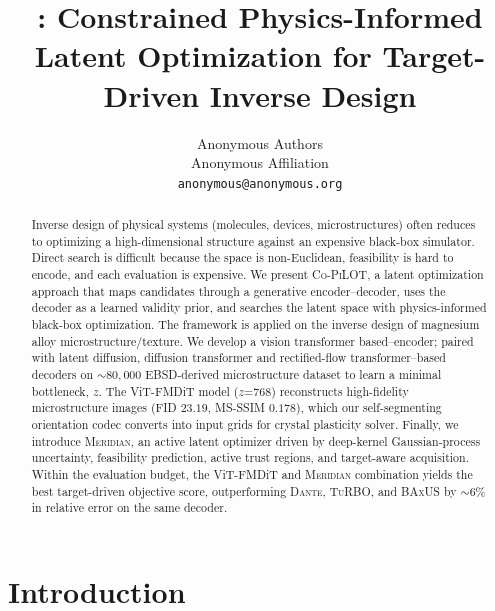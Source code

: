 \documentclass{article}
\title{\Co{}: Constrained Physics-Informed Latent Optimization for Target-Driven Inverse Design}
\author{%
  Anonymous Authors \\
  Anonymous Affiliation \\
  \texttt{anonymous@anonymous.org}
}
\newcommand{\Co}{\textsc{Co-PiLOT}}
\newcommand{\meridian}{\textsc{Meridian}}
\newcommand{\dante}{\textsc{Dante}}
\newcommand{\turbo}{\textsc{TuRBO}}
\newcommand{\baxus}{\textsc{BAxUS}}
\begin{document}
\maketitle

\begin{abstract}
Inverse design of physical systems (molecules, devices, microstructures) often reduces to optimizing a high-dimensional structure against an expensive black-box simulator. Direct search is difficult because the space is non-Euclidean, feasibility is hard to encode, and each evaluation is expensive. We present \Co{}, a latent optimization approach that maps candidates through a generative encoder--decoder, uses the decoder as a learned validity prior, and searches the latent space with physics-informed black-box optimization. The framework is applied on the inverse design of magnesium alloy microstructure/texture. We develop a vision transformer based--encoder; paired with latent diffusion, diffusion transformer and rectified-flow transformer--based decoders on $\sim80{,}000$ EBSD-derived microstructure dataset to learn a minimal bottleneck, $z$. The ViT-FMDiT model ($z$=$768$) reconstructs high-fidelity microstructure images (FID $23.19$, MS-SSIM $0.178$), which our self-segmenting orientation codec converts into input grids for crystal plasticity solver. Finally, we introduce \meridian{}, an active latent optimizer driven by deep-kernel Gaussian-process uncertainty, feasibility prediction, active trust regions, and target-aware acquisition. Within the evaluation budget, the ViT-FMDiT and \meridian{} combination yields the best target-driven objective score, outperforming \dante{}, \turbo{}, and \baxus{} by $\sim\!6\%$ in relative error on the same decoder.
\end{abstract}

\section{Introduction}
\label{sec:intro}
\end{document}
